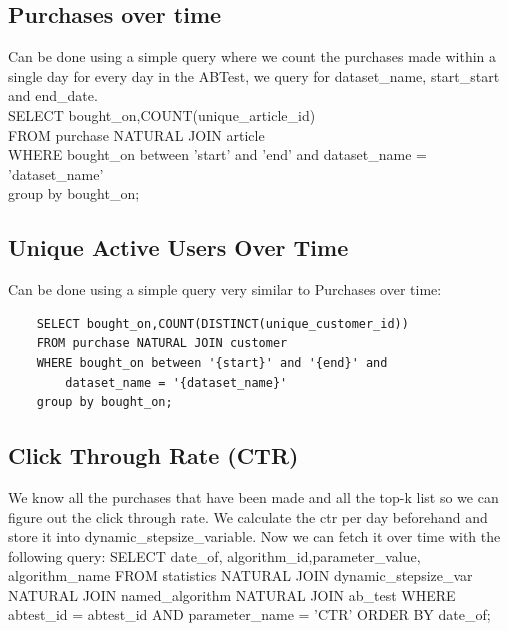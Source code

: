 \documentclass[a4paper,12pt]{article}
\begin{document}
\subsection{Purchases over time}
Can be done using a simple query where we count the purchases made within a single day for every day in the ABTest, we query for dataset\_name, start\_start and end\_date. \\
SELECT bought\_on,COUNT(unique\_article\_id)\\
FROM purchase NATURAL JOIN article\\
WHERE bought\_on between '{start}' and '{end}' and dataset\_name = '{dataset\_name}'  \\
            group by bought\_on;\\

\subsection{Unique Active Users Over Time}
Can be done using a simple query very similar to Purchases over time: \\
\begin{verbatim}
	SELECT bought_on,COUNT(DISTINCT(unique_customer_id))
	FROM purchase NATURAL JOIN customer
	WHERE bought_on between '{start}' and '{end}' and
		dataset_name = '{dataset_name}'
	group by bought_on;
\end{verbatim}
           
\subsection{Click Through Rate (CTR)}
\begin{spverbatim}
We know all the purchases that have been made and all the top-k list so we can figure out the click through rate. We calculate the ctr per day beforehand and store it into dynamic_stepsize_variable. Now we can fetch it over time with the following query:
SELECT date_of, algorithm_id,parameter_value, algorithm_name
FROM statistics 
	NATURAL JOIN dynamic_stepsize_var 
	NATURAL JOIN named_algorithm 
	NATURAL JOIN ab_test 
	WHERE abtest_id = {abtest_id} 
	AND parameter_name = 'CTR' 
	ORDER BY date_of;
\end{spverbatim}
\end{document}
